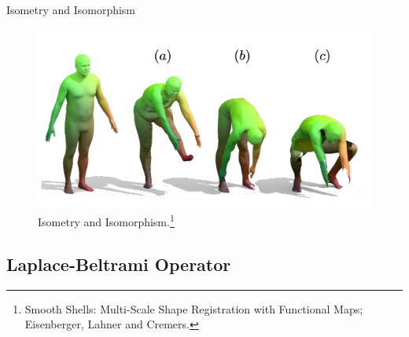 \documentclass{beamer}
\begin{document}
\begin{frame}{Isometry and Isomorphism}


\begin{figure}
    \centering
    \includegraphics[height=0.4\textwidth]{isometry.png}
    \caption{Isometry and Isomorphism.\footnote{Smooth Shells: Multi-Scale Shape Registration with Functional Maps; Eisenberger, Lahner and Cremers.}}
    \label{fig:my_label}
\end{figure}

\end{frame}








\subsection{Laplace-Beltrami Operator}
\end{document}
